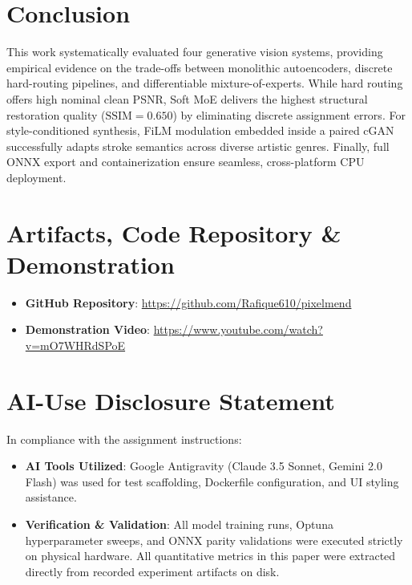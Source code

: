 \documentclass[conference]{IEEEtran}
\begin{document}
\section{Conclusion}
This work systematically evaluated four generative vision systems, providing empirical evidence on the trade-offs between monolithic autoencoders, discrete hard-routing pipelines, and differentiable mixture-of-experts. While hard routing offers high nominal clean PSNR, Soft MoE delivers the highest structural restoration quality ($\text{SSIM} = 0.650$) by eliminating discrete assignment errors. For style-conditioned synthesis, FiLM modulation embedded inside a paired cGAN successfully adapts stroke semantics across diverse artistic genres. Finally, full ONNX export and containerization ensure seamless, cross-platform CPU deployment.




\appendices
\section{Artifacts, Code Repository \& Demonstration}
\begin{itemize}
    \item \textbf{GitHub Repository}: \url{https://github.com/Rafique610/pixelmend}
    \item \textbf{Demonstration Video}: \url{https://www.youtube.com/watch?v=mO7WHRdSPoE}
\end{itemize}

\section{AI-Use Disclosure Statement}
In compliance with the assignment instructions:
\begin{itemize}
    \item \textbf{AI Tools Utilized}: Google Antigravity (Claude 3.5 Sonnet, Gemini 2.0 Flash) was used for test scaffolding, Dockerfile configuration, and UI styling assistance.
    \item \textbf{Verification \& Validation}: All model training runs, Optuna hyperparameter sweeps, and ONNX parity validations were executed strictly on physical hardware. All quantitative metrics in this paper were extracted directly from recorded experiment artifacts on disk.
\end{itemize}
\end{document}
